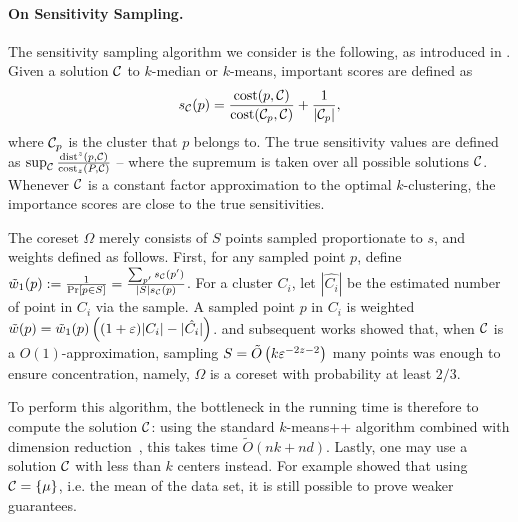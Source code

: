 \paragraph*{On Sensitivity Sampling.}
The sensitivity sampling algorithm we consider is the following, as introduced in \cite{FeldmanL11}.
Given a solution $\mathcal C$ to $k$-median or $k$-means, important scores are defined as
\begin{equation}
\label{eq:sensitivity}
 s_\mathcal C(p) = \dfrac{\operatorname{cost}(p, \mathcal C)}{\operatorname{cost}(\mathcal C_{p}, \mathcal C)} + \dfrac{1}{|\mathcal C_p|},
\end{equation}
where $\mathcal C_p$ is the cluster that $p$ belongs to. The true sensitivity values are defined as $\sup_{\mathcal C} \frac{\operatorname{dist}^z(p, \mathcal C)}{\operatorname{cost}_z(P, \mathcal C)}$ -- where the supremum is taken over all possible solutions $\mathcal C$.
Whenever $\mathcal C$ is a constant factor approximation to the optimal $k$-clustering, the importance scores are close to the true sensitivities. 

The coreset $\Omega$ merely consists of $S$ points sampled proportionate to $s$, and weights defined as follows. First, for any sampled point $p$, define $\tilde w_1(p) := \frac{1}{\Pr[p \in S]} = \frac{\sum_{p'} s_\mathcal C(p')}{|S| s_\mathcal C(p)}$. For a cluster $C_i$, let $|\hat{C_i}|$ be the estimated number of point in $C_i$ via the sample. A sampled point $p$ in $C_i$ is weighted $\tilde w(p) = \tilde w_1(p) \left( (1+\varepsilon)|C_i| - |\hat{C_i}|\right)$.
%
\cite{FeldmanL11} and subsequent works showed that, when $\mathcal C$ is a $O(1)$-approximation, sampling $S = \tilde O\left( k \varepsilon^{-2z-2}\right)$ many points was enough to ensure concentration, namely, $\Omega$ is a coreset with probability at least $2/3$.

 To perform this algorithm, the bottleneck in the running time is therefore to compute the solution $\mathcal C$: using the standard $k$-means++ algorithm \cite{ArV07} combined with dimension reduction~\cite{NaN18}, this takes time $\tilde O(nk +nd)$. Lastly, one may use a solution $\mathcal C$ with less than $k$ centers instead. For example \cite{BachemL018} showed that using $\mathcal C=\{\mu\}$, i.e. the mean of the data set, it is still possible to prove weaker guarantees.



